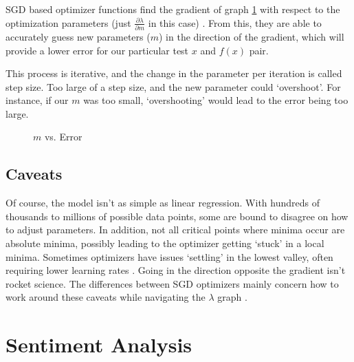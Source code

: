 \documentclass[titlepage,letterpaper]{article}
\begin{document}
SGD based optimizer functions find the gradient of graph \cref{fig:m_vs_error} with respect to the optimization parameters (just $\frac{\partial\lambda}{\partial m}$ in this case) \cite{learn}. From this, they are able to accurately guess new parameters ($m$) in the direction of the gradient, which will provide a lower error for our particular test \(x\) and \(f(x)\) pair. 

This process is iterative, and the change in the parameter per iteration is called step size. Too large of a step size, and the new parameter could `overshoot'. For instance, if our $m$ was too small, `overshooting' would lead to the error being too large.


\begin{figure}
	\vspace*{-.8in}
	\centering
\caption{ \(m\) vs. Error}
\label{fig:m_vs_error}
\def\svgwidth{1.5 in}

\end{figure}

\subsection{Caveats}
Of course, the model isn't as simple as linear regression. With hundreds of thousands to millions of possible data points, some are bound to disagree on how to adjust parameters. In addition, not all critical points where minima occur are absolute minima, possibly leading to the optimizer  getting `stuck' in a local minima. Sometimes optimizers have issues `settling' in the lowest valley, often requiring lower learning rates \cite{adaprop}. Going in the direction opposite the gradient isn't rocket science. The differences between SGD optimizers mainly concern how to work around these caveats while navigating the $\lambda$ graph \cite{adaprop,adam,rmsprop,moment}.

\section{Sentiment Analysis}
\end{document}
